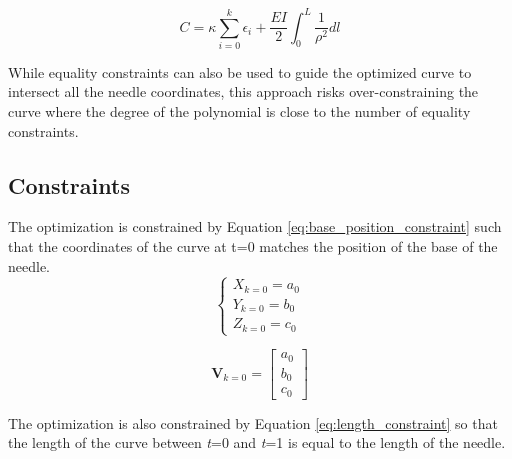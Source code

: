\begin{equation}
\label{eq:cost_function}
C = \kappa \sum_{i=0}^k \epsilon_i + \frac{EI}{2}\int_{0}^{L}\frac{1}{\rho^2}dl
\end{equation}

While equality constraints can also be used to guide the optimized curve to intersect all the needle coordinates, this approach risks over-constraining the curve where the degree of the polynomial is close to the number of equality constraints.



\subsection{Constraints}
The optimization is constrained by Equation \ref{eq:base_position_constraint} such that the coordinates of the curve at t=0 matches the position of the base of the needle.
\begin{equation}
\label{eq:base_position_constraint}
\begin{cases} X_{k=0} = a_0 \\
 Y_{k=0} = b_0  \\
 Z_{k=0} = c_0 \end{cases}
 \end{equation}
 
 \begin{equation}
 \textbf{V}_{k=0}=\begin{bmatrix} a_0 \\ b_0 \\ c_0 \end{bmatrix}
 \end{equation}

The optimization is also constrained by Equation \ref{eq:length_constraint} so that the length of the curve between \textit{t}=0 and \textit{t}=1 is equal to the length of the needle.

